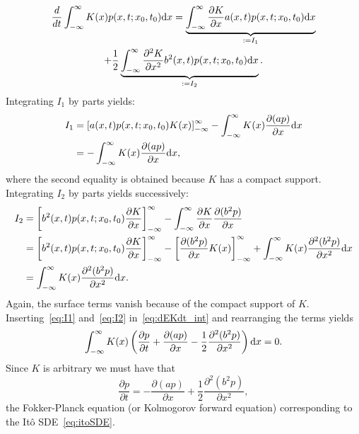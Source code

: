 \begin{multline} \label{eq:dEKdt_int}
	\frac{d}{dt} \int_{-\infty}^{\infty} K(x) p(x,t;x_0,t_0) \rm dx = \underbrace{\int_{-\infty}^{\infty} \frac{\partial K}{\partial x} a(x,t) p(x,t;x_0,t_0) \rm dx}_{:= I_1}\\ + \frac{1}{2} \underbrace{\int_{-\infty}^{\infty} \frac{\partial^2 K}{\partial x^2} b^2(x,t) p(x,t;x_0,t_0) \rm dx}_{:= I_2}.
\end{multline}
Integrating $I_1$ by parts yields:
\begin{align}
	I_1 &= \left[ a(x,t)p(x,t;x_0,t_0)K(x)\right]_{-\infty}^{\infty} - \int_{-\infty}^{\infty} K(x) \frac{\partial{(ap)}}{\partial x} \rm dx \nonumber\\
	&= - \int_{-\infty}^{\infty} K(x) \frac{\partial{(ap)}}{\partial x} \rm dx, \label{eq:I1}
\end{align}
where the second equality is obtained because $K$ has a compact support. Integrating $I_2$ by parts yields successively:
\begin{align}
	I_2 &= 	\left[ b^2(x,t) p(x,t;x_0,t_0) \frac{\partial K}{\partial x} \right]_{-\infty}^{\infty} - \int_{-\infty}^{\infty} \frac{\partial K}{\partial x} \frac{\partial (b^2 p)}{\partial x} \nonumber\\
	&= \left[ b^2(x,t) p(x,t;x_0,t_0) \frac{\partial K}{\partial x} \right]_{-\infty}^{\infty} - \left[ \frac{\partial (b^2 p)}{\partial x} K(x) \right]_{-\infty}^{\infty} +  \int_{-\infty}^{\infty} K(x) \frac{\partial^2 (b^2 p)}{\partial x^2} \rm dx\nonumber\\
	&= \int_{-\infty}^{\infty} K(x) \frac{\partial^2 (b^2 p)}{\partial x^2} \rm dx. \label{eq:I2}
\end{align}
Again, the surface terms vanish because of the compact support of $K$. Inserting~\eqref{eq:I1} and~\eqref{eq:I2} in~\eqref{eq:dEKdt_int} and rearranging the terms yields
\begin{equation}
	\int_{-\infty}^{\infty} K(x) \left( \frac{\partial p}{\partial t} + \frac{\partial (ap)}{\partial x} - \frac{1}{2}\frac{\partial^2 (b^2 p)}{\partial x^2}\right) \rm dx= 0.
\end{equation}
Since $K$ is arbitrary we must have that
\begin{equation} \label{eq:FPito}
	\frac{\partial p}{\partial t} = - \frac{\partial (ap)}{\partial x} + \frac{1}{2}\frac{\partial^2 (b^2 p)}{\partial x^2},
\end{equation}
the Fokker-Planck equation (or Kolmogorov forward equation) corresponding to the Itô SDE~\eqref{eq:itoSDE}.

